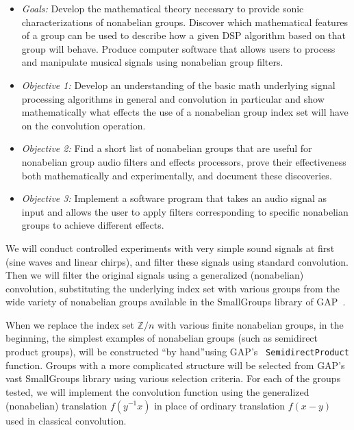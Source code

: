 \documentclass[11pt]{article}
\begin{document}
\begin{itemize}
\item {\it Goals:}
Develop the mathematical theory necessary to provide sonic characterizations of
nonabelian groups. Discover which mathematical features of a group can be used to
describe how a given \ac{DSP} algorithm based on that group will behave. 
Produce computer software that allows users to process and manipulate musical
signals using nonabelian group filters.
\item 
{\it Objective 1:} Develop an understanding of the basic math underlying signal
processing algorithms in general and convolution in particular and show
mathematically what effects the use of a nonabelian group index set will have
on the convolution operation.
\item
{\it Objective 2:} Find a short list of nonabelian groups that are useful for
nonabelian group audio filters and effects processors, prove their effectiveness
both mathematically and experimentally, and document these discoveries.
\item
{\it Objective 3:} Implement a software program that takes an audio signal as input and
allows the user to apply filters corresponding to specific nonabelian groups to
achieve different effects. 
\end{itemize}

 
\vskip5mm

We will conduct controlled experiments with very simple sound signals at first
(sine waves and linear chirps), and filter these signals using
standard convolution.  Then we will filter the original signals using a
generalized (nonabelian) convolution, substituting the underlying index set with
various groups from the wide variety of nonabelian groups available in 
the SmallGroups library of \acs{GAP}~\cite{GAP4}.   

When we replace the index set $\mathbb{Z}/n$ with various finite nonabelian
groups, in the beginning, the simplest examples of nonabelian groups (such as
semidirect product groups), will be constructed ``by hand''using \acs{GAP}'s {\tt
  SemidirectProduct} function.  Groups with a more complicated structure will be
selected from \acs{GAP}'s vast SmallGroups library using various selection criteria.
For each of the groups tested, we will implement the
convolution function using the generalized (nonabelian) translation $f(y^{-1}x)$
in place of ordinary translation $f(x-y)$ used in classical convolution. 
\end{document}
